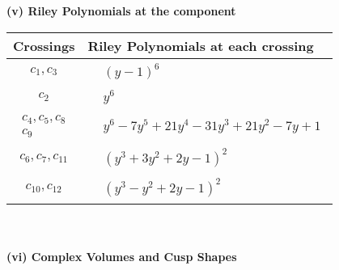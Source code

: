 \documentclass[1p]{elsarticle_modified}
\theoremstyle{definition}
\begin{document}
\newpage\renewcommand{\arraystretch}{1}
\flushleft \textbf{(v) Riley Polynomials at the component}\newline \\
\begin{tabular}{m{50pt}|m{274pt}}
Crossings & \hspace{64pt}Riley Polynomials at each crossing \\
\hline $$\begin{aligned}c_{1},c_{3}\end{aligned}$$&$\begin{aligned}
&(y-1)^6
\end{aligned}$\\
\hline $$\begin{aligned}c_{2}\end{aligned}$$&$\begin{aligned}
&y^6
\end{aligned}$\\
\hline $$\begin{aligned}c_{4},c_{5},c_{8}\\c_{9}\end{aligned}$$&$\begin{aligned}
&y^6-7 y^5+21 y^4-31 y^3+21 y^2-7 y+1
\end{aligned}$\\
\hline $$\begin{aligned}c_{6},c_{7},c_{11}\end{aligned}$$&$\begin{aligned}
&(y^3+3 y^2+2 y-1)^2
\end{aligned}$\\
\hline $$\begin{aligned}c_{10},c_{12}\end{aligned}$$&$\begin{aligned}
&(y^3- y^2+2 y-1)^2
\end{aligned}$\\
\hline
\end{tabular}\\~\\
\newpage\flushleft \textbf{(vi) Complex Volumes and Cusp Shapes}
\end{document}
